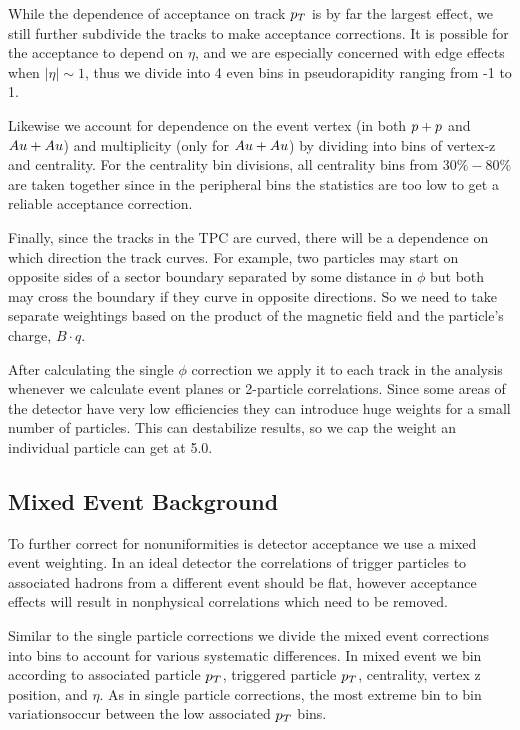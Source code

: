 While the dependence of acceptance on track $p_{T}$ is by far the largest effect, we still further subdivide the tracks to make acceptance corrections. It is possible for the acceptance to depend on $\eta$, and we are especially concerned with edge effects when  $|\eta| \sim 1$, thus we divide into 4 even bins in pseudorapidity ranging from -1 to 1.

Likewise we account for dependence on the event vertex (in both $p+p$ and $Au + Au$) and multiplicity (only for $Au + Au$) by dividing into bins of vertex-z and centrality. For the centrality bin divisions, all centrality bins from $30\%-80\%$ are taken together since in the peripheral bins the statistics are too low to get a reliable acceptance correction.

Finally, since the tracks in the TPC are curved, there will be a dependence on which direction the track curves. For example, two particles may start on opposite sides of a sector boundary separated by some distance in $\phi$ but both may cross the boundary if they curve in opposite directions. So we need to take separate weightings based on the product of the magnetic field and the particle's charge, $B \cdot q$. 

After calculating the single $\phi$ correction we apply it to each track in the analysis whenever we calculate event planes or 2-particle correlations. Since some areas of the detector have very low efficiencies they can introduce huge weights for a small number of particles. This can destabilize results, so we cap the weight an individual particle can get at 5.0.

\subsection{Mixed Event Background}

To further correct for nonuniformities is detector acceptance we use a mixed event weighting. In an ideal detector the correlations of trigger particles to associated hadrons from a different event should be flat, however acceptance effects will result in nonphysical correlations which need to be removed. 

Similar to the single particle corrections we divide the mixed event corrections into bins to account for various systematic differences. In mixed event we bin according to associated particle $p_{T}$, triggered particle $p_{T}$, centrality, vertex z position, and $\eta$. As in single particle corrections, the most extreme bin to bin variationsoccur between the low associated $p_{T}$ bins.   

